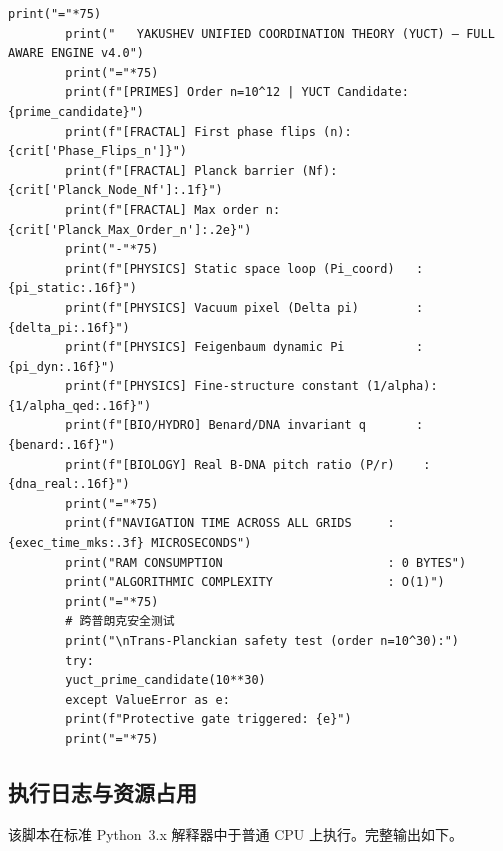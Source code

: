 \documentclass[12pt,a4paper]{article}
\begin{document}
\begin{lstlisting}[caption={完整 YUCT 协调引擎 v4.0 (\texttt{yuct\_constants.py})}, label={lst:yuct-engine}]
		print("="*75)
		print("   YAKUSHEV UNIFIED COORDINATION THEORY (YUCT) — FULL AWARE ENGINE v4.0")
		print("="*75)
		print(f"[PRIMES] Order n=10^12 | YUCT Candidate: {prime_candidate}")
		print(f"[FRACTAL] First phase flips (n): {crit['Phase_Flips_n']}")
		print(f"[FRACTAL] Planck barrier (Nf): {crit['Planck_Node_Nf']:.1f}")
		print(f"[FRACTAL] Max order n: {crit['Planck_Max_Order_n']:.2e}")
		print("-"*75)
		print(f"[PHYSICS] Static space loop (Pi_coord)   : {pi_static:.16f}")
		print(f"[PHYSICS] Vacuum pixel (Delta pi)        : {delta_pi:.16f}")
		print(f"[PHYSICS] Feigenbaum dynamic Pi          : {pi_dyn:.16f}")
		print(f"[PHYSICS] Fine-structure constant (1/alpha): {1/alpha_qed:.16f}")
		print(f"[BIO/HYDRO] Benard/DNA invariant q       : {benard:.16f}")
		print(f"[BIOLOGY] Real B-DNA pitch ratio (P/r)    : {dna_real:.16f}")
		print("="*75)
		print(f"NAVIGATION TIME ACROSS ALL GRIDS     : {exec_time_mks:.3f} MICROSECONDS")
		print("RAM CONSUMPTION                       : 0 BYTES")
		print("ALGORITHMIC COMPLEXITY                : O(1)")
		print("="*75)
		# 跨普朗克安全测试
		print("\nTrans-Planckian safety test (order n=10^30):")
		try:
		yuct_prime_candidate(10**30)
		except ValueError as e:
		print(f"Protective gate triggered: {e}")
		print("="*75)
	\end{lstlisting}
	
	\subsection{执行日志与资源占用}
	
	该脚本在标准 Python~3.x 解释器中于普通 CPU 上执行。完整输出如下。
	
\end{document}
